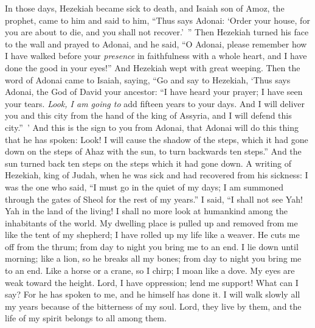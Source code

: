 \begin{biblechapter} %
 In those days, Hezekiah became sick to death, and Isaiah son of Amoz, the prophet, came to him and said to him, “Thus says Adonai: ‘Order your house, for you are about to die, and you shall not recover.’ ”
\verse Then Hezekiah turned his face to the wall and prayed to Adonai,
\verse and he said, “O Adonai, please remember how I have walked before your \textit{presence} in faithfulness with a whole heart, and I have done the good in your eyes!” And Hezekiah wept with great weeping.
\verse Then the word of Adonai came to Isaiah, saying,
\verse “Go and say to Hezekiah, ‘Thus says Adonai, the God of David your ancestor: “I have heard your prayer; I have seen your tears. \textit{Look, I am going to} add fifteen years to your days.
\verse And I will deliver you and this city from the hand of the king of Assyria, and I will defend this city.” ’
\verse And this is the sign to you from Adonai, that Adonai will do this thing that he has spoken:
\verse Look! I will cause the shadow of the steps, which it had gone down on the steps of Ahaz with the sun, to turn backwards ten steps.” And the sun turned back ten steps on the steps which it had gone down.
\verse A writing of Hezekiah, king of Judah, when he was sick and had recovered from his sickness:
\verse I was the one who said, “I must go in the quiet of my days; 
I am summoned through the gates of Sheol for the rest of my years.”
\verse I said, “I shall not see Yah! Yah in the land of the living! 
I shall no more look at humankind among the inhabitants of the world.
\verse My dwelling place is pulled up and removed from me like the tent of my shepherd; 
I have rolled up my life like a weaver. 
He cuts me off from the thrum; 
from day to night you bring me to an end.
\verse I lie down until morning; 
like a lion, so he breaks all my bones; 
from day to night you bring me to an end.
\verse Like a horse or a crane, so I chirp; 
I moan like a dove. 
My eyes are weak toward the height. 
Lord, I have oppression; lend me support!
\verse What can I say? For he has spoken to me, 
and he himself has done it. 
I will walk slowly all my years because of the bitterness of my soul.
\verse Lord, they live by them, and the life of my spirit belongs to all among them. 

\end{biblechapter}
